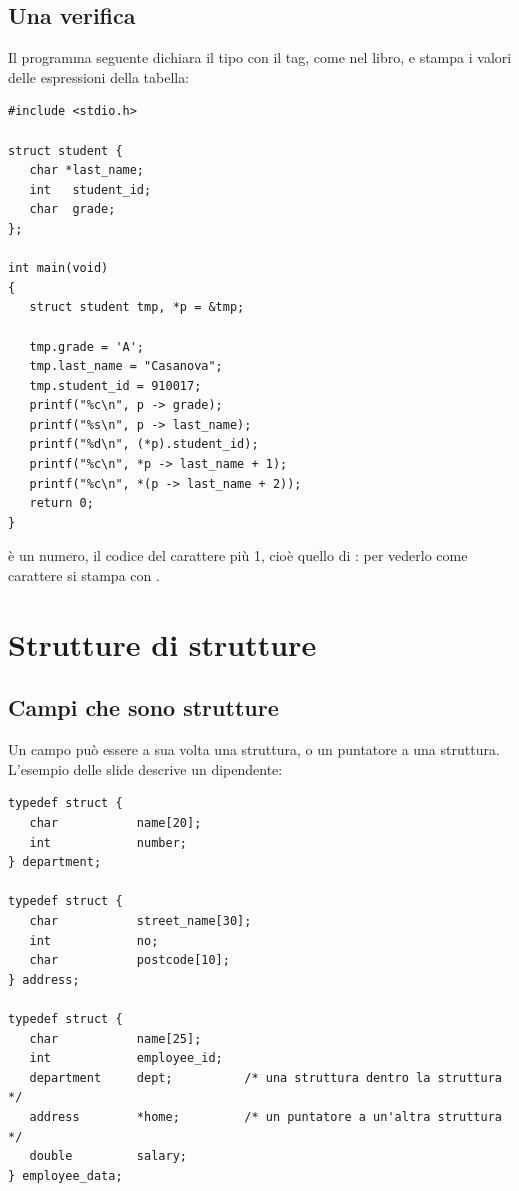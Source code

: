 \subsection{Una verifica}

Il programma seguente dichiara il tipo con il tag, come nel libro, e stampa i
valori delle espressioni della tabella:

\begin{affianco}[0.6][c]
\begin{lstlisting}[style=c, name=puntatori.c]
#include <stdio.h>

struct student {
   char *last_name;
   int   student_id;
   char  grade;
};

int main(void)
{
   struct student tmp, *p = &tmp;

   tmp.grade = 'A';
   tmp.last_name = "Casanova";
   tmp.student_id = 910017;
   printf("%c\n", p -> grade);
   printf("%s\n", p -> last_name);
   printf("%d\n", (*p).student_id);
   printf("%c\n", *p -> last_name + 1);
   printf("%c\n", *(p -> last_name + 2));
   return 0;
}
\end{lstlisting}
\risultato
{}
\end{affianco}

 è un numero, il codice del carattere
 più 1, cioè quello di : per vederlo come carattere si
stampa con .

\section{Strutture di strutture}

\subsection{Campi che sono strutture}

Un campo può essere a sua volta una struttura, o un puntatore a una
struttura. L'esempio delle slide descrive un dipendente:

\begin{lstlisting}[style=c]
typedef struct {
   char           name[20];
   int            number;
} department;

typedef struct {
   char           street_name[30];
   int            no;
   char           postcode[10];
} address;

typedef struct {
   char           name[25];
   int            employee_id;
   department     dept;          /* una struttura dentro la struttura */
   address        *home;         /* un puntatore a un'altra struttura */
   double         salary;
} employee_data;
\end{lstlisting}

